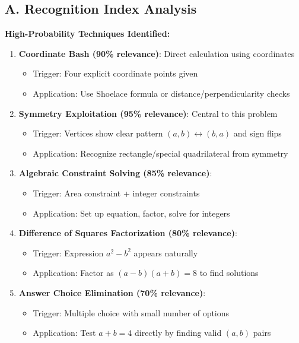 \documentclass[]{article}
\begin{document}
\begin{techniquesbox}
\subsection*{A. Recognition Index Analysis}

\textbf{High-Probability Techniques Identified:}
\begin{enumerate}[leftmargin=*]
    \item \textbf{Coordinate Bash (90\% relevance)}: Direct calculation using coordinates
    \begin{itemize}
        \item Trigger: Four explicit coordinate points given
        \item Application: Use Shoelace formula or distance/perpendicularity checks
    \end{itemize}
    
    \item \textbf{Symmetry Exploitation (95\% relevance)}: Central to this problem
    \begin{itemize}
        \item Trigger: Vertices show clear pattern $(a,b) \leftrightarrow (b,a)$ and sign flips
        \item Application: Recognize rectangle/special quadrilateral from symmetry
    \end{itemize}
    
    \item \textbf{Algebraic Constraint Solving (85\% relevance)}: 
    \begin{itemize}
        \item Trigger: Area constraint + integer constraints
        \item Application: Set up equation, factor, solve for integers
    \end{itemize}
    
    \item \textbf{Difference of Squares Factorization (80\% relevance)}:
    \begin{itemize}
        \item Trigger: Expression $a^2 - b^2$ appears naturally
        \item Application: Factor as $(a-b)(a+b) = 8$ to find solutions
    \end{itemize}
    
    \item \textbf{Answer Choice Elimination (70\% relevance)}:
    \begin{itemize}
        \item Trigger: Multiple choice with small number of options
        \item Application: Test $a+b = 4$ directly by finding valid $(a,b)$ pairs
    \end{itemize}
\end{enumerate}


\end{techniquesbox}
\end{document}
